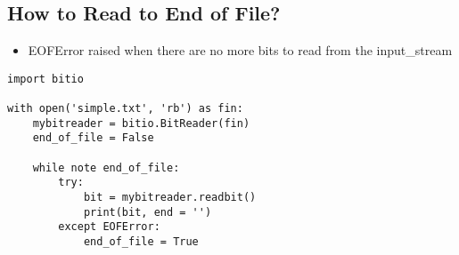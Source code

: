 \documentclass{article}
\begin{document}
\subsection{How to Read to End of File?}
    \begin{itemize}
        \item EOFError raised when there are no more bits to read from the input\_stream
    \end{itemize}
\vspace{-1em}
\begin{lstlisting}
import bitio

with open('simple.txt', 'rb') as fin:
    mybitreader = bitio.BitReader(fin)
    end_of_file = False
    
    while note end_of_file:
        try:
            bit = mybitreader.readbit()
            print(bit, end = '')
        except EOFError:
            end_of_file = True
\end{lstlisting}

\end{document}

